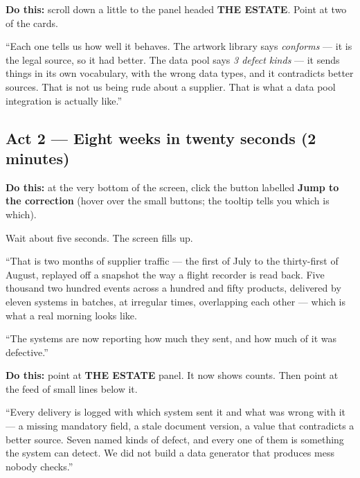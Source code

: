 \documentclass[11pt,a4paper]{article}
\newcommand{\ui}[1]{\textbf{#1}}          %
\begin{document}
\textbf{Do this:} scroll down a little to the panel headed \ui{THE ESTATE}.
Point at two of the cards.

\begin{say}
``Each one tells us how well it behaves. The artwork library says
\emph{conforms} --- it is the legal source, so it had better. The data pool
says \emph{3 defect kinds} --- it sends things in its own vocabulary, with the
wrong data types, and it contradicts better sources. That is not us being rude
about a supplier. That is what a data pool integration is actually like.''
\end{say}

\subsection{Act 2 --- Eight weeks in twenty seconds (2 minutes)}

\textbf{Do this:} at the very bottom of the screen, click the button labelled
\ui{Jump to the correction} (hover over the small buttons; the tooltip tells
you which is which).

Wait about five seconds. The screen fills up.

\begin{say}
``That is two months of supplier traffic --- the first of July to the thirty-first
of August, replayed off a snapshot the way a flight recorder is read back.
Five thousand two hundred events across a hundred and fifty products,
delivered by eleven systems in batches, at irregular times, overlapping each
other --- which is what a real morning looks like.

``The systems are now reporting how much they sent, and how much of it was
defective.''
\end{say}

\textbf{Do this:} point at \ui{THE ESTATE} panel. It now shows counts. Then
point at the feed of small lines below it.

\begin{say}
``Every delivery is logged with which system sent it and what was wrong with
it --- a missing mandatory field, a stale document version, a value that
contradicts a better source. Seven named kinds of defect, and every one of them
is something the system can detect. We did not build a data generator that
produces mess nobody checks.''
\end{say}
\end{document}
